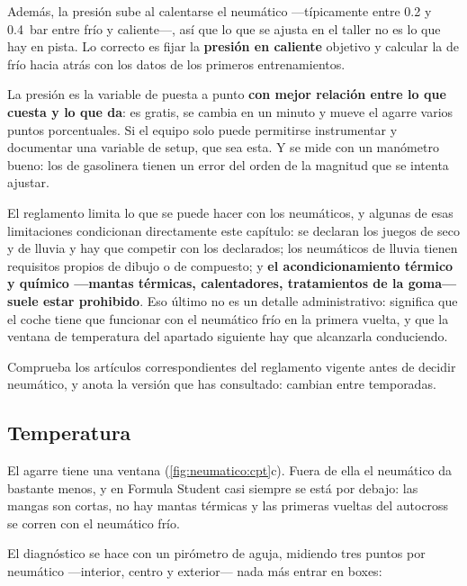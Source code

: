 Además, la presión sube al calentarse el neumático ---típicamente entre
\num{0.2} y \SI{0.4}{\bar} entre frío y caliente---, así que lo que se ajusta en
el taller no es lo que hay en pista. Lo correcto es fijar la \textbf{presión en
caliente} objetivo y calcular la de frío hacia atrás con los datos de los
primeros entrenamientos.

\begin{clave}
La presión es la variable de puesta a punto \textbf{con mejor relación entre lo
que cuesta y lo que da}: es gratis, se cambia en un minuto y mueve el agarre
varios puntos porcentuales. Si el equipo solo puede permitirse instrumentar y
documentar una variable de setup, que sea esta. Y se mide con un manómetro
bueno: los de gasolinera tienen un error del orden de la magnitud que se intenta
ajustar.
\end{clave}

\begin{regla}[neumáticos]
El reglamento limita lo que se puede hacer con los neumáticos, y algunas de esas
limitaciones condicionan directamente este capítulo: se declaran los juegos de
seco y de lluvia y hay que competir con los declarados; los neumáticos de lluvia
tienen requisitos propios de dibujo o de compuesto; y \textbf{el
acondicionamiento térmico y químico ---mantas térmicas, calentadores,
tratamientos de la goma--- suele estar prohibido}. Eso último no es un detalle
administrativo: significa que el coche tiene que funcionar con el neumático frío
en la primera vuelta, y que la ventana de temperatura del apartado siguiente hay
que alcanzarla conduciendo.

Comprueba los artículos correspondientes del reglamento vigente antes de decidir
neumático, y anota la versión que has consultado: cambian entre temporadas.
\end{regla}

\subsection{Temperatura}

El agarre tiene una ventana (\cref{fig:neumatico:cpt}c). Fuera de ella el
neumático da bastante menos, y en Formula Student casi siempre se está por
debajo: las mangas son cortas, no hay mantas térmicas y las primeras vueltas del
autocross se corren con el neumático frío.

El diagnóstico se hace con un pirómetro de aguja, midiendo tres puntos por
neumático ---interior, centro y exterior--- nada más entrar en boxes:

